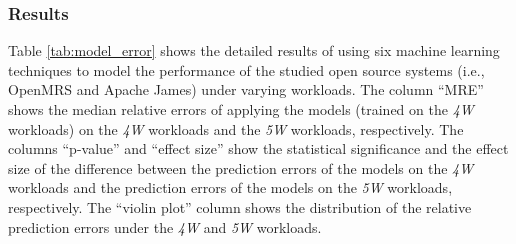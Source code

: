 \subsubsection*{Results}
Table \ref{tab:model_error} shows the detailed results of using six machine learning techniques to model the performance of the studied open source systems (i.e., OpenMRS and Apache James) under varying workloads.
 The column ``MRE'' shows the median relative errors of applying the models (trained on the \emph{4W} workloads) on the \emph{4W} workloads and the \emph{5W} workloads, respectively. 
  The columns ``p-value'' and ``effect size'' show the statistical significance and the effect size of the difference between the prediction errors of the models on the \emph{4W} workloads and the prediction errors of the models on the \emph{5W} workloads, respectively. The ``violin plot'' column shows the distribution of the relative prediction errors under the \emph{4W} and \emph{5W} workloads.

